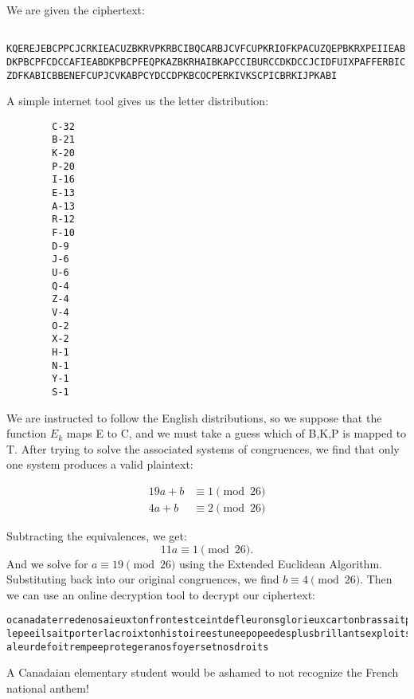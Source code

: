 \documentclass{article}
\begin{document}
We are given the ciphertext: 


\begin{verbatim}
    
KQEREJEBCPPCJCRKIEACUZBKRVPKRBCIBQCARBJCVFCUPKRIOFKPACUZQEPBKRXPEIIEAB
DKPBCPFCDCCAFIEABDKPBCPFEQPKAZBKRHAIBKAPCCIBURCCDKDCCJCIDFUIXPAFFERBIC
ZDFKABICBBENEFCUPJCVKABPCYDCCDPKBCOCPERKIVKSCPICBRKIJPKABI

\end{verbatim}

A simple internet tool gives us the letter distribution:

\begin{verbatim}
        C-32
        B-21
        K-20
        P-20
        I-16
        E-13
        A-13
        R-12
        F-10
        D-9
        J-6
        U-6
        Q-4
        Z-4
        V-4
        O-2
        X-2
        H-1
        N-1
        Y-1
        S-1
\end{verbatim}

We are instructed to follow the English distributions, so we suppose that the function $E_k$ maps E to C, and we must take a guess which of B,K,P is mapped to T. After trying to solve the associated systems of congruences, we find that only one system produces a valid plaintext:

\begin{align*}
    19a+b&\equiv 1\pmod{26}  \\
    4a+b&\equiv 2\pmod{26}
\end{align*}

Subtracting the equivalences, we get:
\[
11a\equiv 1\pmod{26} 
.\] 
And we solve for $a\equiv 19\pmod{26} $ using the Extended Euclidean Algorithm. Substituting back into our original congruences, we find $b\equiv 4\pmod{26} $. Then we can use an online decryption tool to decrypt our ciphertext:

\begin{verbatim}
ocanadaterredenosaieuxtonfrontestceintdefleuronsglorieuxcartonbrassaitporter
lepeeilsaitporterlacroixtonhistoireestuneepopeedesplusbrillantsexploitsettav
aleurdefoitrempeeprotegeranosfoyersetnosdroits
\end{verbatim}

A Canadaian elementary student would be ashamed to not recognize the French national anthem!
\end{document}
